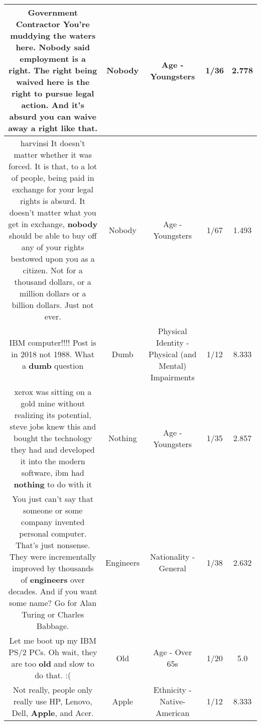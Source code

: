 \documentclass[11pt]{article}
\newlength\mylength
\begin{document}
\begin{center}
\begin{longtable}{|C{.65\mylength}|C{.30\mylength}|C{.12\mylength}|C{.12\mylength}|C{.12\mylength}|}
  \small Government Contractor You're muddying the waters here. \textbf{Nobody} said employment is a right. The right being waived here is the right to pursue legal action. And it's absurd you can waive away a right like that.\normalsize   & Nobody & Age - Youngsters & 1/36 & 2.778 \\  \hline
  \small harvinsi It doesn't matter whether it was forced. It is that, to a lot of people, being paid in exchange for your legal rights is absurd. It doesn't matter what you get in exchange, \textbf{nobody} should be able to buy off any of your rights bestowed upon you as a citizen. Not for a thousand dollars, or a million dollars or a billion dollars. Just not ever.\normalsize   & Nobody & Age - Youngsters & 1/67 & 1.493 \\  \hline
  \small IBM computer!!!! Post is in 2018 not 1988. What a \textbf{dumb} question\normalsize   & Dumb & Physical Identity - Physical (and Mental) Impairments & 1/12 & 8.333 \\  \hline
  \small xerox was sitting on a gold mine without realizing its potential, steve jobs knew this and bought the technology they had and developed it into the modern software, ibm had \textbf{nothing} to do with it\normalsize   & Nothing & Age - Youngsters & 1/35 & 2.857 \\  \hline
  \small You just can't say that someone or some company invented personal computer. That's just nonsense. They were incrementally improved by thousands of \textbf{engineers} over decades. And if you want some name? Go for Alan Turing or Charles Babbage.\normalsize   & Engineers & Nationality - General & 1/38 & 2.632 \\  \hline
  \small Let me boot up my IBM PS/2 PCs. Oh wait, they are too \textbf{old} and slow to do that. :(\normalsize   & Old & Age - Over 65s & 1/20 & 5.0 \\  \hline
  \small Not really, people only really use HP, Lenovo, Dell, \textbf{Apple}, and Acer.\normalsize   & Apple & Ethnicity - Native-American & 1/12 & 8.333 \\  \hline

\end{longtable}
\end{center}
\end{document}
